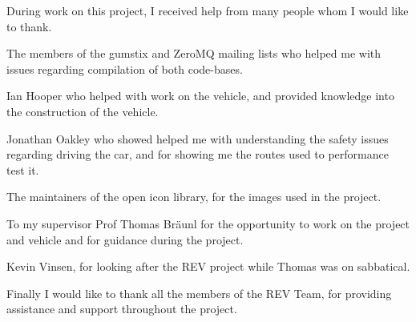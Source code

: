 

\begin{acknowledgements}      %

During work on this project, I received help from many people whom I would like to thank.

The members of the gumstix and ZeroMQ mailing lists who helped me with issues regarding compilation of both code-bases.

Ian Hooper who helped with work on the vehicle, and provided knowledge into the construction of the vehicle.

Jonathan Oakley who showed helped me with understanding the safety issues regarding driving the car, and for showing me the routes used to performance test it.

The maintainers of the open icon library, for the images used in the project.

To my supervisor Prof Thomas Bräunl for the opportunity to work on the project and vehicle and for guidance during the project.

Kevin Vinsen, for looking after the REV project while Thomas was on sabbatical.

Finally I would like to thank all the members of the REV Team, for providing assistance and support throughout the project.

\end{acknowledgements}



